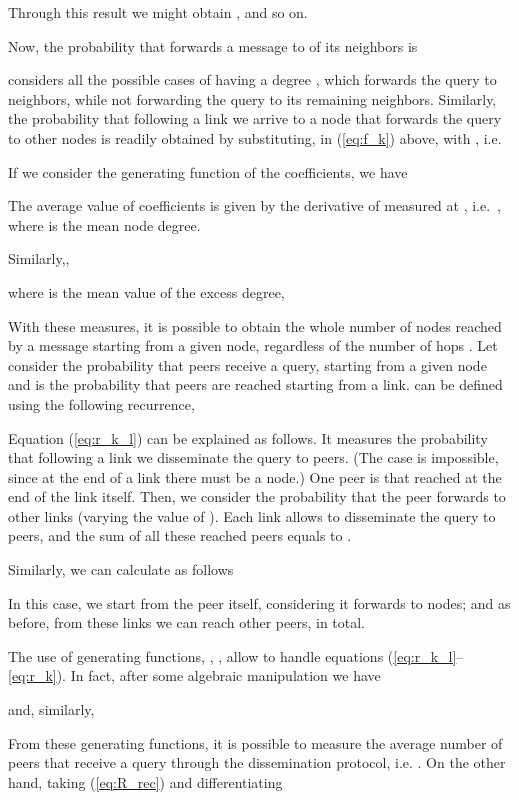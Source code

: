 \documentclass{sig-alternate}
\begin{document}
Through this result we might obtain , and so on.

Now, the probability that  forwards a message to  of its neighbors is

 considers all the possible cases of  having a degree , which forwards the query to  neighbors, while not forwarding the query to its remaining  neighbors.
Similarly, the probability that following a link we arrive to a node that forwards the query to  other nodes is readily obtained by substituting, in (\ref{eq:f_k}) above,  with , i.e.


If we consider the generating function  of the  coefficients, we have

The average value of coefficients  is given by the derivative of  measured at , i.e.~, 
where  is the mean node degree.

Similarly,,

where  is the mean value of the excess degree,




With these measures, it is possible to obtain the whole number of nodes reached by a message starting from a given node, regardless of the number of hops \cite{newmanHandbook}. Let consider the probability  that  peers receive a query, starting from a given node and  is the probability that  peers are reached starting from a link.  can be defined using the following recurrence,

Equation (\ref{eq:r_k_l}) can be explained as follows. It measures the probability that following a link we disseminate the query to  peers. (The case  is impossible, since at the end of a link there must be a node.) One peer is that reached at the end of the link itself. Then, we consider the probability that the peer forwards to other  links (varying the value of ). Each link  allows to disseminate the query to  peers, and the sum of all these reached peers equals to .

Similarly, we can calculate  as follows

In this case, we start from the peer itself, considering it forwards to  nodes; and as before, from these  links we can reach  other peers, in total.

The use of generating functions, , , allow to handle equations (\ref{eq:r_k_l}--\ref{eq:r_k}). In fact, after some algebraic manipulation we have

and, similarly,

From these generating functions, 
it is possible
to measure the average number  of peers that receive a query through the dissemination protocol, i.e.
. On the other hand, taking (\ref{eq:R_rec}) and differentiating 
\end{document}

